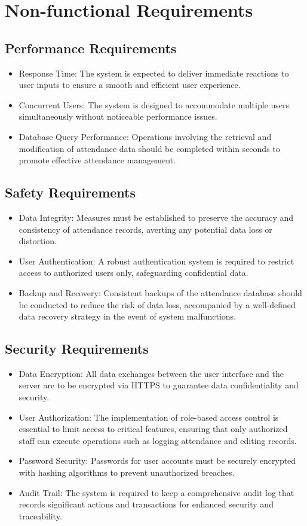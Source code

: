 \documentclass[a4paper, 12pt]{article}
\begin{document}
\newpage
\section{Non-functional Requirements}
\subsection{Performance Requirements}
\begin{itemize}
    \item Response Time: The system is expected to deliver immediate reactions to user inputs to ensure a smooth and efficient user experience.
    \item Concurrent Users: The system is designed to accommodate multiple users simultaneously without noticeable performance issues.
    \item Database Query Performance: Operations involving the retrieval and modification of attendance data should be completed within seconds to promote effective attendance management.
\end{itemize}

\subsection{Safety Requirements}
\begin{itemize}
    \item Data Integrity: Measures must be established to preserve the accuracy and consistency of attendance records, averting any potential data loss or distortion.
    \item User Authentication: A robust authentication system is required to restrict access to authorized users only, safeguarding confidential data.
    \item Backup and Recovery: Consistent backups of the attendance database should be conducted to reduce the risk of data loss, accompanied by a well-defined data recovery strategy in the event of system malfunctions.
\end{itemize}

\subsection{Security Requirements}
\begin{itemize}
    \item Data Encryption: All data exchanges between the user interface and the server are to be encrypted via HTTPS to guarantee data confidentiality and security.
    \item User Authorization: The implementation of role-based access control is essential to limit access to critical features, ensuring that only authorized staff can execute operations such as logging attendance and editing records.
    \item Password Security: Passwords for user accounts must be securely encrypted with hashing algorithms to prevent unauthorized breaches.
    \item Audit Trail: The system is required to keep a comprehensive audit log that records significant actions and transactions for enhanced security and traceability.
\end{itemize}
\end{document}
